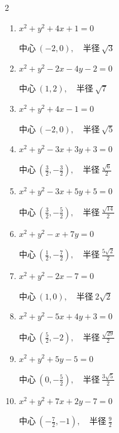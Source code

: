 \begin{multicols}{2}
\begin{enumerate}
        $\displaystyle 中心\: \left(\frac{1}{2},-2\right), \quad 半径 \ \frac{5}{2}$

  \item $x^{2}+y^{2}+4x+1=0$

        $\displaystyle 中心\: \left(-2,0\right), \quad 半径 \ \sqrt{3}$

  \item $x^{2}+y^{2}-2x-4y-2=0$

        $\displaystyle 中心\: \left(1,2\right), \quad 半径 \ \sqrt{7}$

  \item $x^{2}+y^{2}+4x-1=0$

        $\displaystyle 中心\: \left(-2,0\right), \quad 半径 \ \sqrt{5}$

  \item $x^{2}+y^{2}-3x+3y+3=0$

        $\displaystyle 中心\: \left(\frac{3}{2},-\frac{3}{2}\right), \quad 半径 \ \frac{\sqrt{6}}{2}$

  \item $x^{2}+y^{2}-3x+5y+5=0$

        $\displaystyle 中心\: \left(\frac{3}{2},-\frac{5}{2}\right), \quad 半径 \ \frac{\sqrt{14}}{2}$

  \item $x^{2}+y^{2}-x+7y=0$

        $\displaystyle 中心\: \left(\frac{1}{2},-\frac{7}{2}\right), \quad 半径 \ \frac{5\sqrt{2}}{2}$

  \item $x^{2}+y^{2}-2x-7=0$

        $\displaystyle 中心\: \left(1,0\right), \quad 半径 \ 2\sqrt{2}$

\columnbreak %

\resetques

  \item $x^{2}+y^{2}-5x+4y+3=0$

        $\displaystyle 中心\: \left(\frac{5}{2},-2\right), \quad 半径 \ \frac{\sqrt{29}}{2}$

  \item $x^{2}+y^{2}+5y-5=0$

        $\displaystyle 中心\: \left(0,-\frac{5}{2}\right), \quad 半径 \ \frac{3\sqrt{5}}{2}$

  \item $x^{2}+y^{2}+7x+2y-7=0$

        $\displaystyle 中心\: \left(-\frac{7}{2},-1\right), \quad 半径 \ \frac{9}{2}$


\end{enumerate}
\end{multicols}
